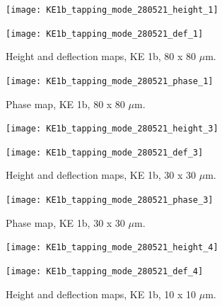 

\begin{figure}[H]
\centering
\begin{minipage}{.45\textwidth}
  \centering
  \texttt{[image: KE1b\_tapping\_mode\_280521\_height\_1]}
\end{minipage}
\begin{minipage}{.45\textwidth}
  \centering
  \texttt{[image: KE1b\_tapping\_mode\_280521\_def\_1]}
\end{minipage}
\caption[Height and deflection maps, KE 1b]{Height and deflection maps, KE 1b, 80 x 80 $\mu$m.}
\label{fig:afm_ke1b_height_def_1}
\end{figure}

\begin{figure}[H]
\centering
  \texttt{[image: KE1b\_tapping\_mode\_280521\_phase\_1]}
\caption[Phase map, KE 1b]{Phase map, KE 1b, 80 x 80 $\mu$m.}
\label{fig:afm_ke1b_phase_1}
\end{figure}


\begin{figure}[H]
\centering
\begin{minipage}{.45\textwidth}
  \centering
  \texttt{[image: KE1b\_tapping\_mode\_280521\_height\_3]}
\end{minipage}
\begin{minipage}{.45\textwidth}
  \centering
  \texttt{[image: KE1b\_tapping\_mode\_280521\_def\_3]}
\end{minipage}
\caption[Height and deflection maps, KE 1b]{Height and deflection maps, KE 1b, 30 x 30 $\mu$m.}
\label{fig:afm_ke1b_height_def_2}
\end{figure}

\begin{figure}[H]
\centering
  \texttt{[image: KE1b\_tapping\_mode\_280521\_phase\_3]}
\caption[Phase map, KE 1b]{Phase map, KE 1b, 30 x 30 $\mu$m.}
\label{fig:afm_ke1b_phase_2}
\end{figure}


\begin{figure}[H]
\centering
\begin{minipage}{.45\textwidth}
  \centering
  \texttt{[image: KE1b\_tapping\_mode\_280521\_height\_4]}
\end{minipage}
\begin{minipage}{.45\textwidth}
  \centering
  \texttt{[image: KE1b\_tapping\_mode\_280521\_def\_4]}
\end{minipage}
\caption[Height and deflection maps, KE 1b]{Height and deflection maps, KE 1b, 10 x 10 $\mu$m.}
\label{fig:afm_ke1b_height_def_3}
\end{figure}

